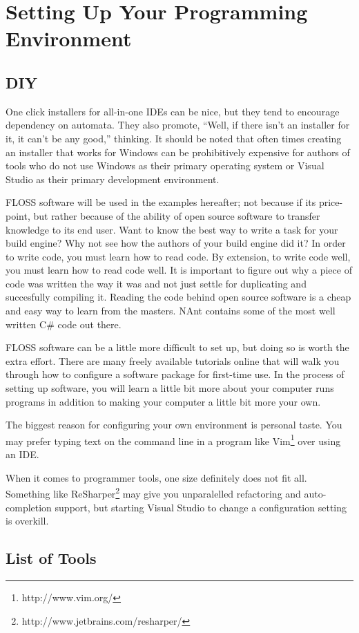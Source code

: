 
\chapter{Setting Up Your Programming Environment}

\section{DIY}
One click installers for all-in-one \glspl{IDE} can be nice, but they tend to encourage dependency on automata. They also promote, ``Well, if there 
isn't an installer for it, it can't be any good,'' thinking. It should be noted that often times creating an installer that works for Windows can be
prohibitively expensive for authors of tools who do not use Windows as their primary operating system or Visual Studio as their primary development 
environment.

\gls{FLOSS} software will be used in the examples hereafter; not because if its price-point, but rather because of the ability of open source software
to transfer knowledge to its end user. Want to know the best way to write a task for your build engine? Why not see how the authors of your build
engine did it? In order to write code, you must learn how to read code. By extension, to write code well, you must learn how to read code well. It is 
important to figure out why a piece of code was written the way it was and not just settle for duplicating and succesfully compiling it. Reading the 
code behind open source software is a cheap and easy way to learn from the masters. NAnt contains some of the most well written C\# code out there.

\gls{FLOSS} software can be a little more difficult to set up, but doing so is worth the extra effort. There are many freely available tutorials
online that will walk you through how to configure a software package for first-time use. In the process of setting up software, you will learn a
little bit more about your computer runs programs in addition to making your computer a little bit more your own.

The biggest reason for configuring your own environment is personal taste. You may prefer typing text on the command line in a program like 
Vim\footnote{http://www.vim.org/} over using an \gls{IDE}.

When it comes to programmer tools, one size definitely does not fit all. Something like ReSharper\footnote{http://www.jetbrains.com/resharper/} 
may give you unparalelled \gls{refactoring} and \gls{auto-completion} support, but starting Visual Studio to change a configuration setting is 
overkill.

\section{List of Tools}